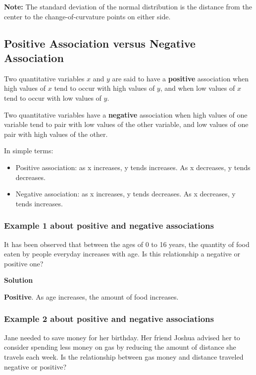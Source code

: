 \textbf{Note:} The standard deviation of the normal distribution is the distance from the center to the change-of-curvature points on either side.


\subsection{Positive Association versus Negative Association}
Two quantitative variables $x$ and $y$ are said to have a \textbf{positive} association when high values of $x$ tend to occur with high values of $y$, and when low values of $x$ tend to occur with low values of $y$. 

\vspace{0.2cm}
 
\noindent Two quantitative variables have a \textbf{negative} association when high values of one variable tend to pair with low values of the other variable, and low values of one pair with high values 
of the other. 

\vspace{0.2cm}

\noindent In simple terms:
 \begin{itemize}
    \item Positive association: as x increases, y tends increases. As x decreases, y tends decreases.
    \item Negative association: as x increases, y tends decreases. As x decreases, y tends increases. 
\end{itemize}

\subsubsection*{Example 1 about positive and negative associations}
It has been observed that between the ages of 0 to 16 years, the quantity of food eaten by people everyday increases with age. Is this relationship a negative or positive one? 

\vspace{0.2cm}

\textbf{Solution}

\vspace{0.2cm}

\noindent \textbf{Positive}. As age increases, the amount of food increases. 

\subsubsection*{Example 2 about positive and negative associations}
Jane needed to save money for her birthday. Her friend Joshua advised her to consider spending less money on gas by reducing the amount of distance she travels each week. Is the relationship between gas money and distance traveled negative or positive? 

